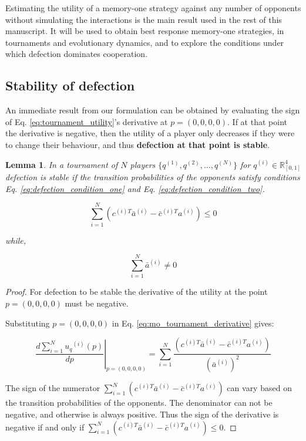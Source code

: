 \documentclass[10pt]{article}
\newcommand{\R}{\mathbb{R}}
\newtheorem{lemma}[theorem]{Lemma}
\begin{document}
Estimating the utility of a memory-one strategy against any number of opponents
without simulating the interactions is the main result used in the rest of this manuscript.
It will be used to obtain best response memory-one strategies, in tournaments
and evolutionary dynamics, and to explore the conditions under which defection
dominates cooperation.

\subsection{Stability of defection}\label{subsection:stability_defection}

An immediate result from our formulation can be
obtained by evaluating the sign of Eq. \ref{eq:tournament_utility}'s derivative
at \(p=(0, 0, 0, 0)\). If at that point the
derivative is negative, then the utility of a player only decreases if they were
to change their behaviour, and thus \textbf{defection at that point is stable}.

\begin{lemma}\label{lemma:stability_of_defection}
    In a tournament of \(N\) players \(\{q^{(1)}, q^{(2)}, \dots, q^{(N)} \}\)
    for \(q^{(i)} \in \R_{[0, 1]} ^ 4\)
    defection is stable if the transition probabilities of the
    opponents satisfy conditions Eq. \ref{eq:defection_condition_one} and Eq. \ref{eq:defection_condition_two}.

    \begin{equation}\label{eq:defection_condition_one}
        \sum_{i=1} ^ N (c^{(i)T} \bar{a}^{(i)} - \bar{c}^{(i)T} a^{(i)}) \leq 0
    \end{equation}

    while,

    \begin{equation}\label{eq:defection_condition_two}
        \sum_{i=1} ^ N \bar{a}^{(i)} \neq 0
    \end{equation}
\end{lemma}

\begin{proof}
    For defection to be stable the derivative of the utility
    at the point \(p = (0, 0, 0, 0)\) must be negative.

    Substituting \(p = (0, 0, 0, 0)\) in
    Eq. \ref{eq:mo_tournament_derivative} gives:

    \begin{equation}
        \left.\frac{d\sum\limits_{i=1} ^ {N} {u_q}^{(i)} (p)}{dp} \right\rvert_{p=(0,0,0,0)} =
    \sum_{i=1} ^ N \frac{(c^{(i)T} \bar{a}^{(i)} - \bar{c}^{(i)T} a^{(i)})}
    {(\bar{a}^{(i)})^2}
    \end{equation}

    The sign of the numerator \( \displaystyle\sum_{i=1} ^ N (c^{(i)T} \bar{a}^{(i)} - \bar{c}^{(i)T} a^{(i)})\)
    can vary based on the transition probabilities of the opponents.
    The denominator can not be negative, and otherwise is always positive.
    Thus the sign of the derivative is negative if and only if
    \( \displaystyle\sum_{i=1} ^ N (c^{(i)T} \bar{a}^{(i)} - \bar{c}^{(i)T} a^{(i)}) \leq 0\).
\end{proof}
\end{document}
